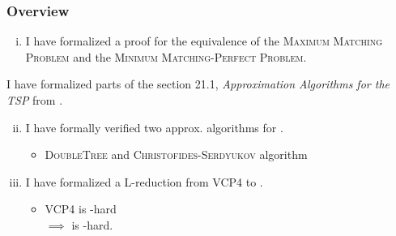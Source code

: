 \documentclass{beamer} %
\begin{document}
\begin{frame}
  \frametitle{Overview}

  \begin{enumerate}[(i)]
    \item I have formalized a proof for the equivalence of the \textsc{Maximum Matching Problem} and the \textsc{Minimum Matching-Perfect Problem}.
  \end{enumerate}
  \vspace*{0.25cm}

  \pause
  I have formalized parts of the section 21.1, \textit{Approximation Algorithms for the TSP} from \parencite{korte_vygen_2018}.
  \vspace*{0.25cm}
  \begin{enumerate}[(i)]
    \setcounter{enumi}{1}
    \item<1,2-> I have formally verified two approx. algorithms for \mTSP{}.
      \begin{itemize}
        \item \textsc{DoubleTree} and \textsc{Christofides-Serdyukov} algorithm
      \end{itemize}
      \vspace*{0.25cm}
    \item<1,3-> I have formalized a L-reduction from \textsc{VCP4}\footnotemark{} to \mTSP{}.
      \begin{itemize}
        \item \textsc{VCP4} is \maxSNP{}-hard \parencite[Thm. 16.46,][]{korte_vygen_2018}\\ $\implies$ \mTSP{} is \maxSNP{}-hard.
      \end{itemize}
  \end{enumerate}
\end{frame}
\end{document}
